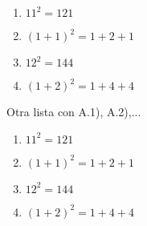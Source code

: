 \documentclass{article}
\begin{document}
\begin{enumerate}[(a.)]
\item $11^2=121$
\item $(1+1)^2=1+2+1$
\item $12^2=144$
\item $(1+2)^2=1+4+4$
\end{enumerate}
Otra lista con A.1), A.2),...\\
\begin{enumerate}[font=\sffamily\bfseries,
label=A.\arabic*)]
\item $11^2=121$
\item $(1+1)^2=1+2+1$
\item $12^2=144$
\item $(1+2)^2=1+4+4$
\end{enumerate}
\end{document}
